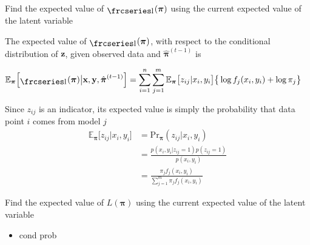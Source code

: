 \documentclass{beamer}
\newcommand{\textfrc}[1]{{\frcseries#1}}
\newcommand{\mathfrc}[1]{\raisebox{-0.8mm}{\text{\textfrc{\small #1}}}\hspace{0.4mm}}
\newcommand{\eqn}[1]{\begin{align*}
#1
\end{align*}}
\newcommand{\vect}[1]{\boldsymbol{\mathbf{#1}}}
\newcommand{\bl}{\big\{}
\newcommand{\br}{\big\}}
\newcommand{\vx}{\vect{x}}
\newcommand{\vy}{\vect{y}}
\newcommand{\vp}{\vect{\pi}}
\newcommand{\vph}{\hat{\vect{\pi}}}
\newcommand{\sumn}{\sum^n_{i=1}}
\newcommand{\summ}{\sum^m_{j=1}}
\newcommand{\fab}{f_j}
\newcommand{\llp}{\mathfrc{l}(\vect{\pi})}
\begin{document}
\begin{frame}{Find the expected value of $\llp$ using the current expected value of the latent variable}
	
	The expected value of $\llp$, with respect to the conditional distribution of $\vect{z}$, given observed data and $\vph^{(t-1)}$ is
	
	\eqn{
		\mathbb{E}_{\vp}\Big[\llp \big| \vx,\vy,\vph^{(t-1)} \Big] &= \sumn \summ \mathbb{E}_{\vp}\big[z_{ij}|x_i,y_i\big] \bl \log \fab(x_i,y_i) + \log \pi_j  \br
	}
	
	Since $z_{ij}$ is an indicator, its expected value is simply the probability that data point $i$ comes from model $j$
	\eqn{
		\mathbb{E}_{\vp}\Big[  z_{ij} | x_i, y_i \Big]	&= \text{Pr}_{\vp}(z_{ij}|x_i,y_i)	\\
										&= \frac{p(x_i,y_i|z_{ij}=1)p(z_{ij}=1)}{p(x_i,y_i)}	\\
										&=  \frac{\pi_j \fab(x_i,y_i)  }{\summ \pi_j \fab(x_i,y_i)}
	}
\end{frame}
\begin{frame}[shrink]{Find the expected value of $L(\vect{\pi})$ using the current expected value of the latent variable}
	
	\begin{itemize}
		\item cond prob
	\end{itemize}
	
\end{frame}
\end{document}
